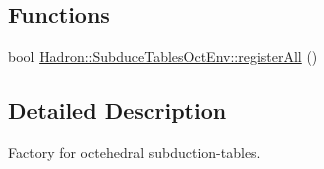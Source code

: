 \subsection*{Functions}
\begin{DoxyCompactItemize}
\item 
bool \mbox{\hyperlink{namespaceHadron_1_1SubduceTablesOctEnv_a51ef987c89c5e4509cb7c7c24fb152d6}{Hadron\+::\+Subduce\+Tables\+Oct\+Env\+::register\+All}} ()
\end{DoxyCompactItemize}


\subsection{Detailed Description}
Factory for octehedral subduction-\/tables. 

